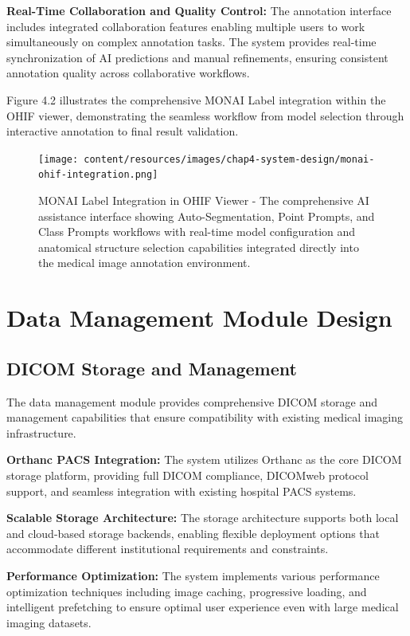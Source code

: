 \textbf{Real-Time Collaboration and Quality Control:} The annotation interface includes integrated collaboration features enabling multiple users to work simultaneously on complex annotation tasks. The system provides real-time synchronization of AI predictions and manual refinements, ensuring consistent annotation quality across collaborative workflows.

Figure 4.2 illustrates the comprehensive MONAI Label integration within the OHIF viewer, demonstrating the seamless workflow from model selection through interactive annotation to final result validation.

\begin{figure}[htbp]
\centering
\texttt{[image: content/resources/images/chap4-system-design/monai-ohif-integration.png]}
\caption{MONAI Label Integration in OHIF Viewer - The comprehensive AI assistance interface showing Auto-Segmentation, Point Prompts, and Class Prompts workflows with real-time model configuration and anatomical structure selection capabilities integrated directly into the medical image annotation environment.}
\label{fig:monai-ohif-integration}
\end{figure}

\section{Data Management Module Design}

\subsection{DICOM Storage and Management}

The data management module provides comprehensive DICOM storage and management capabilities that ensure compatibility with existing medical imaging infrastructure.

\textbf{Orthanc PACS Integration:} The system utilizes Orthanc as the core DICOM storage platform, providing full DICOM compliance, DICOMweb protocol support, and seamless integration with existing hospital PACS systems.

\textbf{Scalable Storage Architecture:} The storage architecture supports both local and cloud-based storage backends, enabling flexible deployment options that accommodate different institutional requirements and constraints.

\textbf{Performance Optimization:} The system implements various performance optimization techniques including image caching, progressive loading, and intelligent prefetching to ensure optimal user experience even with large medical imaging datasets.

